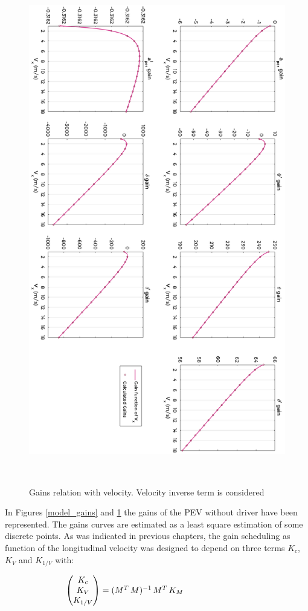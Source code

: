 \newpage
\begin{figure}[!h]
	\includegraphics[width=0.8\linewidth]{figs/06/control/model_gains_inverse}
	\caption{Gains relation with velocity. Velocity inverse term is considered}
	\label{model_gains_inverse}
	\\[-0.5cm]
\end{figure}

\newpage
In Figures \ref{model_gains} and \ref{model_gains_inverse} the gains of the PEV without driver have been represented. The gains curves are estimated as a least square estimation of some discrete points. As was indicated in previous chapters, the gain scheduling as function of the longitudinal velocity was designed to depend on three terms $K_{c}$, $K_{V}$ and $K_{1/V}$  with:

$\hspace{2.5cm}\begin{pmatrix} K_{c} \\ K_{V} \\ K_{1/V} \end{pmatrix}=(M^{T}\,M)^{-1}\,M^{T}\,K_{M}$

